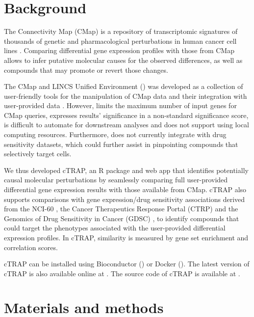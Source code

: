 \section{Background}

The Connectivity Map (CMap) is a repository of transcriptomic signatures of thousands of genetic and pharmacological perturbations in human cancer cell lines \cite{subramanian:2017ul}. Comparing differential gene expression profiles with those from CMap allows to infer putative molecular causes for the observed differences, as well as compounds that may promote or revert those changes.

The CMap and LINCS Unified Environment () was developed as a collection of user-friendly tools for the manipulation of CMap data and their integration with user-provided data \cite{subramanian:2017ul}. However,  limits the maximum number of input genes for CMap queries, expresses results' significance in a non-standard significance score, is difficult to automate for downstream analyses and does not support using local computing resources. Furthermore,  does not currently integrate with drug sensitivity datasets, which could further assist in pinpointing compounds that selectively target cells.

We thus developed cTRAP, an R package and web app that identifies potentially causal molecular perturbations by seamlessly comparing full user-provided differential gene expression results with those available from CMap. cTRAP also supports comparisons with gene expression/drug sensitivity associations derived from the NCI-60 \cite{shoemaker:2006wi}, the Cancer Therapeutics Response Portal (CTRP) \cite{seashore-ludlow:2015ws} and the Genomics of Drug Sensitivity in Cancer (GDSC) \cite{yang:2012vk}, to identify compounds that could target the phenotypes associated with the user-provided differential expression profiles. In cTRAP, similarity is measured by gene set enrichment \cite{subramanian:2017ul,subramanian:2005wu} and correlation scores.

cTRAP can be installed using Bioconductor () or Docker (). The latest version of cTRAP is also available online at . The source code of cTRAP is available at .

\section{Materials and methods}

